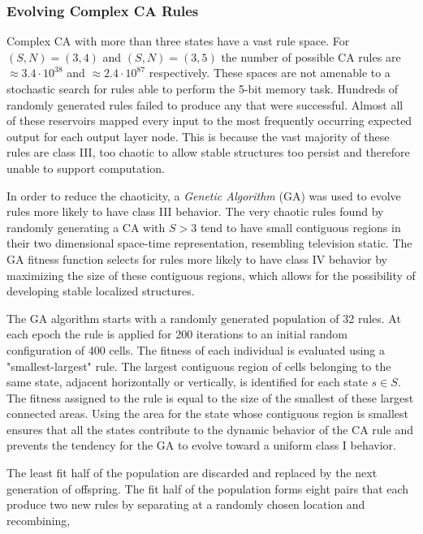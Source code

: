 \documentclass{elsarticle}
\begin{document}
\begin{multicols}{2}
	\subsubsection{Evolving Complex CA Rules}
	Complex CA with more than three states have a vast rule space. For $(S,N) = 
	(3,4)$ and $(S,N) = (3,5)$ the number of possible CA rules are $\approx 3.4 
	\cdot 10^{38}$ and $\approx 2.4 \cdot 10^{87}$ respectively. These spaces 
	are not amenable to a stochastic search for rules able to perform the 5-bit 
	memory task.  Hundreds of randomly generated rules failed to produce any 
	that were successful. Almost all of these reservoirs mapped every input to 
	the most frequently occurring expected output for each output layer node.  
	This is because the vast majority of these rules are class III, too chaotic 
	to allow stable structures too persist and therefore unable to support 
	computation.\par
	In order to reduce the chaoticity, a \textit{Genetic Algorithm} (GA) 
	\cite{mitchell1996evolving} was used to evolve rules more likely to have class 
	III behavior. The very chaotic rules found by randomly generating a CA with $S 
	> 3$ tend to have small contiguous regions in their two dimensional space-time 
	representation, resembling television static.  The GA fitness function selects 
	for rules more likely to have class IV behavior by maximizing the size of these 
	contiguous regions, which allows for the possibility of developing stable 
	localized structures. \par The GA algorithm starts with a randomly 
	generated population of 32 rules. At each epoch the rule is applied for 
	200 iterations to an initial random configuration of 400 cells.  The 
	fitness of each individual is evaluated using a "smallest-largest" rule.  
	The largest contiguous region of cells belonging to the same state, 
	adjacent horizontally or vertically, is identified for each state $s 
	\in S$. The fitness assigned to the rule is equal to the size of 
	the smallest of these largest connected areas. Using the area for 
	the state whose contiguous region is smallest ensures that all the 
	states contribute to the dynamic behavior of the CA rule and 
	prevents the tendency for the GA to evolve toward a uniform class 
	I behavior.  \par The least fit half of the population are 
	discarded and replaced by the next generation of offspring.  The 
	fit half of the population forms eight pairs that each produce two 
        new rules by separating at a randomly chosen location and recombining, 

\end{multicols}
\end{document}
